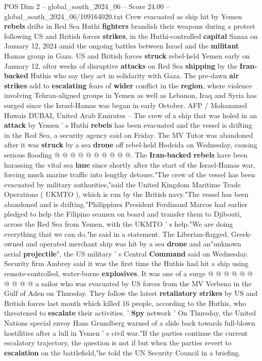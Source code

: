 \begin{textsample}{POS Dim 2 – global\_south\_2024\_06 – Score 24.00 – global\_south\_2024\_06/109164020.txt}  \label{ex:f2_pos_112}
Crew evacuated as ship hit by Yemen \textbf{rebels} drifts in Red Sea Huthi \textbf{fighters} brandish their weapons during a protest following US and British forces \textbf{strikes}, in the Huthi-controlled \textbf{capital} Sanaa on January 12, 2024 amid the ongoing battles between Israel and the \textbf{militant} Hamas group in Gaza.
US and British forces \textbf{struck} rebel-held Yemen early on January 12, after weeks of disruptive \textbf{attacks} on Red Sea \textbf{shipping} by the \textbf{Iran-backed} Huthis who say they act in solidarity with Gaza.
The pre-dawn \textbf{air} \textbf{strikes} add to \textbf{escalating} fears of \textbf{wider} conflict in the \textbf{region}, where violence involving Tehran-aligned groups in Yemen as well as Lebanon, Iraq and Syria has surged since the Israel-Hamas was began in early October.
AFP / Mohammed Huwais DUBAI, United Arab Emirates -- The crew of a ship that was holed in an \textbf{attack} by Yemen ' s Huthi \textbf{rebels} has been evacuated and the vessel is drifting in the Red Sea, a security agency said on Friday.
The MV Tutor was abandoned after it was \textbf{struck} by a sea \textbf{drone} off rebel-held Hodeida on Wednesday, causing serious flooding @ @ @ @ @ @ @ @ @ @.
The \textbf{Iran-backed} \textbf{rebels} have been harassing the vital sea \textbf{lane} since shortly after the start of the Israel-Hamas war, forcing much marine traffic into lengthy detours."The crew of the vessel has been evacuated by military authorities,"said the United Kingdom Maritime Trade Operations ( UKMTO ), which is run by the British navy."The vessel has been abandoned and is drifting."Philippines President Ferdinand Marcos had earlier pledged to help the Filipino seamen on board and transfer them to Djibouti, across the Red Sea from Yemen, with the UKMTO ' s help."We are doing everything that we can do,"he said in a statement.
The Liberian-flagged, Greek-owned and operated merchant ship was hit by a sea \textbf{drone} and an"unknown aerial \textbf{projectile}", the US military ' s Central \textbf{Command} said on Wednesday.
Security firm Ambrey said it was the first time the Huthis had hit a ship using remote-controlled, water-borne \textbf{explosives}.
It was one of a surge @ @ @ @ @ @ @ @ @ @ a sailor who was evacuated by US forces from the MV Verbena in the Gulf of Aden on Thursday.
They follow the latest \textbf{retaliatory} \textbf{strikes} by US and British forces last month which killed 16 people, according to the Huthis, who threatened to \textbf{escalate} their activities. ' \textbf{Spy} network ' On Thursday, the United Nations special envoy Hans Grundberg warned of a slide back towards full-blown hostilities after a lull in Yemen ' s civil war."If the parties continue the current escalatory trajectory, the question is not if but when the parties revert to \textbf{escalation} on the battlefield,"he told the UN Security Council in a briefing.

\end{textsample}
